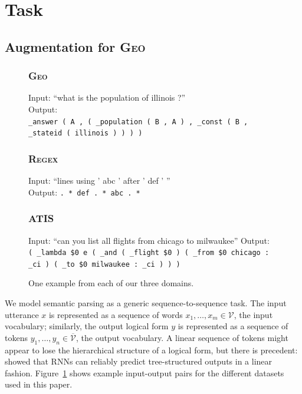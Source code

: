 \documentclass[11pt,letterpaper]{article}
\newcommand{\atis}{\textsc{ATIS}\xspace}
\newcommand{\regex}{\textsc{Regex}\xspace}
\newcommand{\geo}{\textsc{Geo}\xspace}
\newcommand{\vocabin}{\mathcal{V}}
\newcommand{\vocabout}{\overline{\mathcal{V}}}
\begin{document}
\section{Task}
\subsection{Augmentation for \geo}
\begin{figure}[t] 
\small
\begin{framed}
\footnotesize
\subsubsection*{\geo}
Input: ``what is the population of illinois ?''\\
Output: \\
\texttt{\_answer ( A , ( \_population ( B , A ) , \_const ( B , \_stateid ( illinois ) ) ) )}

\subsubsection*{\regex}
Input: ``lines using ' abc ' after ' def ' ''\\
Output: \texttt{. * def . * abc . *}

\subsubsection*{\atis}
Input: ``can you list all flights from chicago to milwaukee''
Output: \\
\texttt{( \_lambda \$0 e ( \_and ( \_flight \$0 ) ( \_from \$0 chicago : \_ci ) ( \_to \$0 milwaukee : \_ci ) ) )}


\end{framed}
\caption{One example from each of our three domains.}
\label{fig:task}
\end{figure}

We model semantic parsing as a generic sequence-to-sequence task.
The input utterance $x$ is represented as a sequence of words $x_1, \dotsc, x_m
\in \vocabin$, the input vocabulary;
similarly, the output logical form $y$ is represented
as a sequence of tokens $y_1, \dotsc, y_n \in \vocabout$, the output vocabulary.
A linear sequence of tokens might appear to lose the hierarchical structure of a logical form,
but there is precedent: 
showed that RNNs can reliably predict tree-structured outputs
in a linear fashion.
Figure~\ref{fig:task} shows example input-output pairs for the different
datasets used in this paper.
\end{document}
